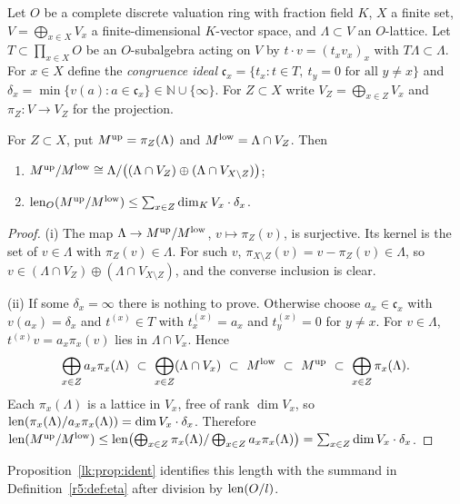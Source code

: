 Let $O$ be a complete discrete valuation ring with fraction field $K$, $X$ a finite set, $V=\bigoplus_{x\in X}V_x$ a finite-dimensional $K$-vector space, and $\Lambda\subset V$ an $O$-lattice. Let $T\subset\prod_{x\in X}O$ be an $O$-subalgebra acting on $V$ by $t\cdot v=(t_xv_x)_x$ with $T\Lambda\subset\Lambda$. For $x\in X$ define the \emph{congruence ideal} $\mathfrak c_x=\{t_x: t\in T,\ t_y=0\text{ for all }y\ne x\}$ and $\delta_x=\min\{v(a):a\in\mathfrak c_x\}\in\mathbb N\cup\{\infty\}$. For $Z\subset X$ write $V_Z=\bigoplus_{x\in Z}V_x$ and $\pi_Z\colon V\to V_Z$ for the projection.

\begin{proposition}\label{w4:prop:cong}
For $Z\subset X$, put $M^{\rm up}=\pi_Z(\Lambda)$ and $M^{\rm low}=\Lambda\cap V_Z$. Then
\begin{enumerate}[leftmargin=*,label=(\roman*)]
\item $M^{\rm up}/M^{\rm low}\cong\Lambda/\bigl((\Lambda\cap V_Z)\oplus(\Lambda\cap V_{X\setminus Z})\bigr)$;
\item $\operatorname{len}_O(M^{\rm up}/M^{\rm low})\le\sum_{x\in Z}\dim_KV_x\cdot\delta_x$.
\end{enumerate}
\end{proposition}

\begin{proof}
(i) The map $\Lambda\to M^{\rm up}/M^{\rm low}$, $v\mapsto\pi_Z(v)$, is surjective. Its kernel is the set of $v\in\Lambda$ with $\pi_Z(v)\in\Lambda$. For such $v$, $\pi_{X\setminus Z}(v)=v-\pi_Z(v)\in\Lambda$, so $v\in(\Lambda\cap V_Z)\oplus(\Lambda\cap V_{X\setminus Z})$, and the converse inclusion is clear.

(ii) If some $\delta_x=\infty$ there is nothing to prove. Otherwise choose $a_x\in\mathfrak c_x$ with $v(a_x)=\delta_x$ and $t^{(x)}\in T$ with $t^{(x)}_x=a_x$ and $t^{(x)}_y=0$ for $y\ne x$. For $v\in\Lambda$, $t^{(x)}v=a_x\pi_x(v)$ lies in $\Lambda\cap V_x$. Hence
\[
\bigoplus_{x\in Z}a_x\pi_x(\Lambda)\ \subset\ \bigoplus_{x\in Z}(\Lambda\cap V_x)\ \subset\ M^{\rm low}\ \subset\ M^{\rm up}\ \subset\ \bigoplus_{x\in Z}\pi_x(\Lambda).
\]
Each $\pi_x(\Lambda)$ is a lattice in $V_x$, free of rank $\dim V_x$, so $\operatorname{len}(\pi_x(\Lambda)/a_x\pi_x(\Lambda))=\dim V_x\cdot\delta_x$. Therefore $\operatorname{len}(M^{\rm up}/M^{\rm low})\le\operatorname{len}\bigl(\bigoplus_{x\in Z}\pi_x(\Lambda)/\bigoplus_{x\in Z}a_x\pi_x(\Lambda)\bigr)=\sum_{x\in Z}\dim V_x\cdot\delta_x$.
\end{proof}

Proposition~\ref{lk:prop:ident} identifies this length with the summand in Definition~\ref{r5:def:eta} after division by $\operatorname{len}(O/l)$.

